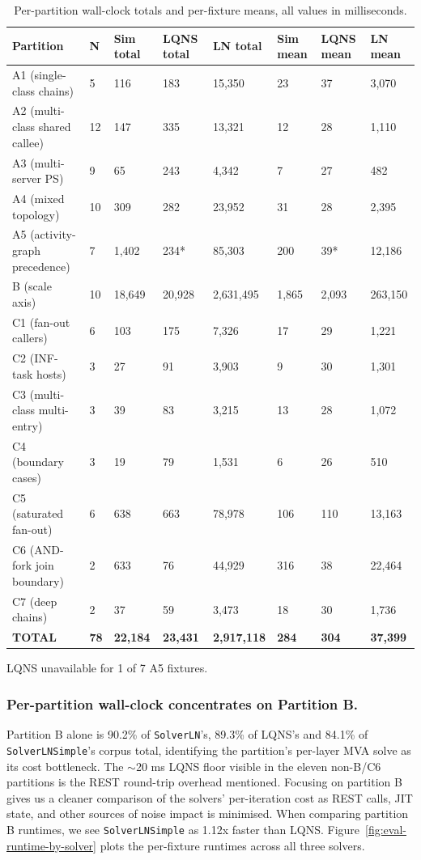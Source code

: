 \begin{table}[h]
\centering
\footnotesize
\setlength{\tabcolsep}{4pt}
\begin{tabular}{|>{\raggedright\arraybackslash}p{3.6cm}|l|l|l|l|l|l|l|}
\hline
Partition & N & Sim total & LQNS total & LN total & Sim mean & LQNS mean & LN mean \\
\hline
A1 (single-class chains) & 5 & 116 & 183 & 15,350 & 23 & 37 & 3,070 \\ \hline
A2 (multi-class shared callee) & 12 & 147 & 335 & 13,321 & 12 & 28 & 1,110 \\ \hline
A3 (multi-server PS) & 9 & 65 & 243 & 4,342 & 7 & 27 & 482 \\ \hline
A4 (mixed topology) & 10 & 309 & 282 & 23,952 & 31 & 28 & 2,395 \\ \hline
A5 (activity-graph precedence) & 7 & 1,402 & 234* & 85,303 & 200 & 39* & 12,186 \\ \hline
B (scale axis) & 10 & 18,649 & 20,928 & 2,631,495 & 1,865 & 2,093 & 263,150 \\ \hline
C1 (fan-out callers) & 6 & 103 & 175 & 7,326 & 17 & 29 & 1,221 \\ \hline
C2 (INF-task hosts) & 3 & 27 & 91 & 3,903 & 9 & 30 & 1,301 \\ \hline
C3 (multi-class \texttimes{} multi-entry) & 3 & 39 & 83 & 3,215 & 13 & 28 & 1,072 \\ \hline
C4 (boundary cases) & 3 & 19 & 79 & 1,531 & 6 & 26 & 510 \\ \hline
C5 (saturated fan-out) & 6 & 638 & 663 & 78,978 & 106 & 110 & 13,163 \\ \hline
C6 (AND-fork join boundary) & 2 & 633 & 76 & 44,929 & 316 & 38 & 22,464 \\ \hline
C7 (deep chains) & 2 & 37 & 59 & 3,473 & 18 & 30 & 1,736 \\ \hline
\textbf{TOTAL} & \textbf{78} & \textbf{22,184} & \textbf{23,431} & \textbf{2,917,118} & \textbf{284} & \textbf{304} & \textbf{37,399} \\
\hline
\end{tabular}
{\footnotesize LQNS unavailable for 1 of 7 A5 fixtures.}
\caption{Per-partition wall-clock totals and per-fixture means, all values in milliseconds.}
\label{tab:eval-runtime-per-partition}
\end{table}

\subsubsection*{Per-partition wall-clock concentrates on Partition B.}
Partition B alone is 90.2\% of \texttt{SolverLN}'s, 89.3\% of LQNS's and 84.1\% of \texttt{SolverLNSimple}'s corpus total, identifying the partition's per-layer MVA solve as its cost bottleneck. The $\sim$20 ms LQNS floor visible in the eleven non-B/C6 partitions is the REST round-trip overhead mentioned. Focusing on partition B gives us a cleaner comparison of the solvers' per-iteration cost as REST calls, JIT state, and other sources of noise impact is minimised. When comparing partition B runtimes, we see \texttt{SolverLNSimple} as 1.12x faster than LQNS. Figure~\ref{fig:eval-runtime-by-solver} plots the per-fixture runtimes across all three solvers.

